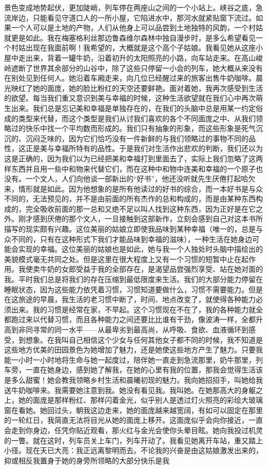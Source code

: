 \par 景色变成地势起伏，更加陡峭，列车停在两座山之间的一个小站上。峡谷之底，急流岸边，只能看见守道口人的一所小屋，它陷进水中，那河水就紧贴窗下流过。如果一个人可以是土地的产物，人们从他身上可以品尝到土地独特的风韵，一个村姑就更是如此。我在梅塞格利丝那边鲁森维尔森林中独自漫步时，是多么希望看见一个村姑出现在我面前啊！我希望的，大概就是这个高个子姑娘。我看见她从这座小屋中走出来，背着一罐牛奶，沿着初升的太阳照亮的小路，向车站走来。在高山峻岭遮断了世界其余部分的山谷中，除了这些只停留一小会的列车，她大概从来没有在别处见到任何人。她沿着车厢走来，向几位已经醒过来的旅客出售牛奶咖啡。晨光映红了她的面庞，她的脸比粉红的天空还要鲜艳。面对着她，我再次感受到生活的欲望。每当我们重又意识到美与幸福的时候，这种生活欲望就在我们心中再次萌生出来。我们总是忘记美和幸福是单独存在的，在我们的头脑中总是用某一约定俗成的类型来代替，而这个类型是我们从讨我们喜欢的各个不同面庞之中、从我们领略过的快乐中找一个平均数而形成的。我们只有抽象的形象，而这些形象是死气沉沉的、沉闷乏味的，因为它们恰巧没有一件新鲜的与我们领略过的事物不同的品性，这正是美与幸福所特有的品性。于是我们对生活作出悲欢的判断，我们还以为这是正确的，因为我们以为已经把美和幸福打到里面去了，实际上我们忽略了这两样东西并且用一些中和物来代替它们，而在这种中和物中连美和幸福的一个原子也没有。一个文人，人们向他谈一部新出的“好书”，他还没听就先生厌倦打起哈欠来，情形就是如此。因为他想象的是所有他读过的好书的综合，而一本好书是与众不同的，无法预见的，并不是由前面的所有杰作的总和构成的，而是由某种东西构成的，完全吸收前面的那一总和又绝不足以叫人找到这种东西，因为正好是在它之外。刚才感到厌倦的那个文人，一旦接触到这部新作，立刻会感到自己对这本书所描写的现实颇有兴趣。这位美丽的姑娘立即使我品味到某种幸福（唯一的，总是与众不同的，只有在这种形式下我们才能品味到幸福的滋味），一种生活在她身边可能会实现的幸福。这位美丽的姑娘也是如此，她与我一个人独处时头脑中描绘出的美貌模式毫无共同之处。但是这里在很大程度上又有一个习惯的短暂中止在起作用。我使卖牛奶的女郎受益于我的全部存在，是渴望品尝强烈享受、站在她对面的我。平时我们总是将我们的存在压缩到最低限度来生活。我们的大部分能力停留在睡眠状态，因为这些能力依凭着习惯，习惯知道要做什么，习惯不需要能力。但是在这旅途的早晨，我生活的老习惯中断了，时间、地点改变了，就使得各种能力必须出来。我的习惯是经常在家，不早起。这个习惯现在不在了，我的各种能力就全都跑过来以代替习惯，而且各种能力之间还要比比谁有干劲，像波涛一样，全都升高到非同寻常的同一水平——从最卑劣到最高尚，从呼吸、食欲、血液循环到感受，到想象。在我叫自己相信这个少女与任何其他女子都不同的时候，我不知道是这些地方优美的田园景色为她增加了魅力，还是她使这些地方产生了魅力。只要我能一小时一小时地将生命与她一起度过，陪伴她一直走到急流那里，奶牛那里，列车旁，一直在她身边，感到她了解我，在她的心里有我的位置，那我会觉得生活该是多么甜蜜！她会教我领略乡村生活和晨曦初现的魅力。我向她招招手，叫她给我送牛奶咖啡来。我需要她注意到我。她没有看见我。我叫她。在她那高大的身躯之上，她的面庞是那样粉红、那样闪着金光，似乎别人是透过灯火照亮的彩绘大玻璃窗在看她。她回过头，朝我这边走来，她的面庞越来越宽阔，有如可以固定在那里的一轮红日，我简直无法将目光从她的面庞上移开。这面庞似乎会向你接近，一直会走到你身边，任凭你贴近观看，那火红与金光会使你头晕目眩。她向我投过机灵的一瞥。就在这时，列车员关上车门，列车开动了。我看见她离开车站，重又踏上小径。现在天已大亮：我正远离黎明而去。不论我的兴奋是由这姑娘激发出来的，抑或相反我置身于她的身旁所领略的大部分快乐是我